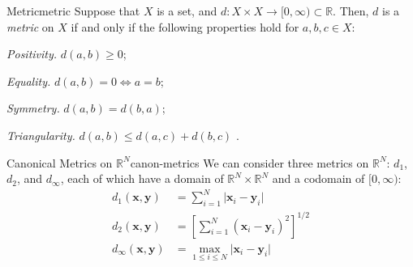 \documentclass{article}
\renewcommand*\vec{\mathbf}
\numberwithin{equation}{section}
\newcommand*\setaxiomprefix[1]{
    \setlist[axioms]{label=#1\arabic*), ref=#1\arabic*}
}
\begin{document}
\begin{definition}{Metric}{metric}
    Suppose that $ X $ is a set, and $ d \colon X \times X \to [0, \infty)
    \subset \mathbb{R} $. Then, $ d $ is a \emph{metric} on $ X $ if and only if
    the following properties hold for $ a, b, c \in X $:
    \setaxiomprefix{M}
    \begin{axioms}
        \item \emph{Positivity.} $ d(a, b) \geq 0 $;
        \item \emph{Equality.} $ d(a, b) = 0 \iff a = b $;
        \item \emph{Symmetry.} $ d(a, b) = d(b, a) $;
        \item \emph{Triangularity.} $ d(a, b) \leq d(a, c) + d(b, c) $
            \label{axiom:triangle-inequality}.
    \end{axioms}
\end{definition}
\begin{definition}{Canonical Metrics on \texorpdfstring{$\mathbb{R}^N$}{an
        N-dimensional real vector space}}{canon-metrics}
    We can consider three metrics on $ \mathbb{R}^N $: $ d_1 $, $ d_2 $, and
    $ d_\infty $, each of which have a domain of $ \mathbb{R}^N \times
    \mathbb{R}^N $ and a codomain of $ [0, \infty) $:
    \begin{align}
        d_1(\vec{x}, \vec{y}) &= \sum_{i=1}^N \vert \vec{x}_i - \vec{y}_i
            \vert \\
        d_2(\vec{x}, \vec{y}) &= \left[\sum_{i=1}^N (\vec{x}_i - \vec{y}_i)^2
            \right]^{1/2} \label{eqn:d2-metric} \\[.8em]
        d_\infty(\vec{x}, \vec{y}) &= \max_{1 \leq i \leq N} \vert \vec{x}_i -
            \vec{y}_i \vert
    \end{align}
\end{definition}
\end{document}
